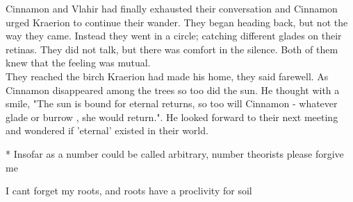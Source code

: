 

Cinnamon and Vlahir had finally exhausted their conversation and Cinnamon urged Kraerion to continue their wander. They began heading back, but not the way they came. Instead they went in a circle; catching different glades on their retinas. They did not talk, but there was comfort in the silence. Both of them knew that the feeling was mutual. \\


They reached the birch Kraerion had made his home, they said farewell. As Cinnamon disappeared among the trees so too did the sun. He thought with a smile, "The sun is bound for eternal returns, so too will Cinnamon - whatever glade or burrow , she would return.". He looked forward to their next meeting and wondered if 'eternal' existed in their world.      


* Insofar as a number could be called arbitrary, number theorists please forgive me

I cant forget my roots, and roots have a proclivity for soil






